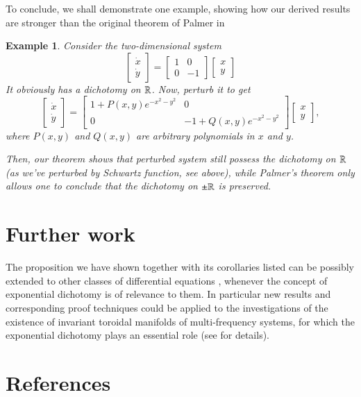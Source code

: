 \documentclass{elsarticle}
\newtheorem{example}{\indent Example}[section]
\theoremstyle{remark}
\begin{document}
To conclude, we shall demonstrate one example, showing how our derived results are stronger than the original theorem of Palmer in
\cite{palmer1984exponential} 
\begin{example}
	Consider the two-dimensional system
	\[\begin{bmatrix}\dot{x}\\\dot{y}\end{bmatrix}=
		\begin{bmatrix}1&0\\0&-1\end{bmatrix}
	\begin{bmatrix}{x}\\{y}\end{bmatrix}\]
	It obviously has a dichotomy on $\mathbb{R}$. Now, perturb it to get
	\[\begin{bmatrix}\dot{x}\\\dot{y}\end{bmatrix}=
		\begin{bmatrix}1+P(x,y)e^{-x^2-y^2}&0\\0&-1+Q(x,y)e^{-x^2-y^2}\end{bmatrix}
	\begin{bmatrix}{x}\\{y}\end{bmatrix},\]
	where $P(x,y)$ and $Q(x,y)$ are arbitrary polynomials in $x$ and $y$.

	Then, our theorem shows that perturbed system still possess the dichotomy on $\mathbb{R}$ (as we've perturbed by Schwartz function, see above),
	while Palmer's theorem only allows one to conclude that the dichotomy on $\pm\mathbb{R}$ is preserved.
\end{example}
\section{Further work}%
The proposition we have shown together with its corollaries listed can be possibly extended to other classes of differential equations
, whenever the concept of exponential dichotomy is of relevance to them. In particular new results and corresponding proof techniques
could be applied to the investigations of the existence of invariant toroidal manifolds of multi-frequency systems, for
 which the exponential dichotomy plays an essential role (see \cite{samoilenko2012elements,mitropolsky2002dichotomies} for details).
\section*{References}

\end{document}
